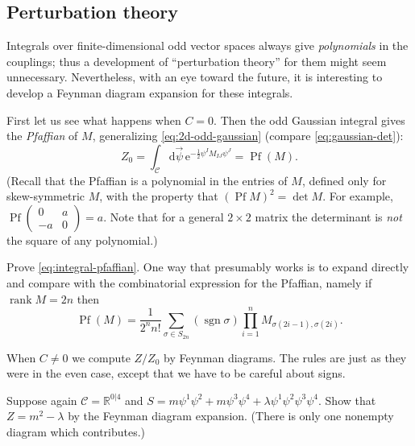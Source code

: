 \documentclass[12pt,letterpaper,reqno]{article}
\numberwithin{equation}{section}
\newcommand{\cC}{\ensuremath{\mathcal C}}
\newcommand{\R}{\ensuremath{\mathbb R}}
\newcommand{\half}{\ensuremath{\frac{1}{2}}}
\newcommand{\e}{{\mathrm e}}
\newcommand{\de}{\mathrm{d}}
\newcommand{\ti}[1]{\textit{#1}}
\DeclareMathOperator{\sgn}{sgn}
\DeclareMathOperator{\rank}{rank}
\DeclareMathOperator{\Pf}{Pf}
\newcommand{\fixme}[1]{{\color{orange}{[#1]}}}
\begin{document}
\subsection{Perturbation theory}

Integrals over finite-dimensional 
odd vector spaces always give \ti{polynomials} in the couplings; 
thus a development of
``perturbation theory'' for them might seem unnecessary.
Nevertheless, with an eye toward the future, it is interesting to
develop a Feynman diagram expansion for these integrals.

First let us see what happens when $C = 0$.
Then the odd Gaussian integral gives the \ti{Pfaffian} of $M$,
generalizing \eqref{eq:2d-odd-gaussian}
(compare \eqref{eq:gaussian-det}):
\begin{equation} \label{eq:integral-pfaffian}
  Z_0 = \int_\cC \de \vec\psi \, \e^{-\half \psi^I M_{IJ} \psi^J} = \Pf (M).
\end{equation}
(Recall that the Pfaffian is a polynomial in the entries of $M$, defined
only for skew-symmetric $M$, with the property that $(\Pf M)^2 = \det M$.
For example, $\Pf \begin{pmatrix} 0 & a \\ -a & 0 \end{pmatrix} = a$. Note that
for a general $2 \times 2$ matrix the determinant is \ti{not} the square of 
any polynomial.)
\begin{exercise} Prove \eqref{eq:integral-pfaffian}. One way that
presumably works is to expand directly and compare with the
combinatorial expression for the Pfaffian, namely if $\rank M = 2n$ then
\begin{equation}
  \Pf(M) = \frac{1}{2^n n!} \sum_{\sigma \in S_{2n}} (\sgn \sigma) \prod_{i=1}^n M_{\sigma(2i-1), \sigma(2i)}.
\end{equation}
\end{exercise}

When $C \neq 0$ we compute $Z / Z_0$ by Feynman diagrams.
The rules are just as they were in the even case, except that
we have to be careful about signs.
\fixme{...}


\begin{exercise} Suppose again $\cC = \R^{0 \vert 4}$ and $S = m \psi^1 \psi^2 + m \psi^3 \psi^4 + \lambda \psi^1 \psi^2 \psi^3 \psi^4$. Show that $Z = m^2 - \lambda$ by the Feynman diagram expansion. (There is only
one nonempty diagram which contributes.)
\end{exercise}
\end{document}
